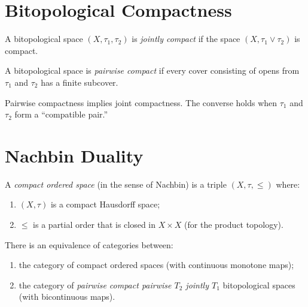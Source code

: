 \section{Bitopological Compactness}

\begin{definition}
A bitopological space $(X,\tau_1,\tau_2)$ is \emph{jointly compact} if the space
$(X, \tau_1 \vee \tau_2)$ is compact.
\end{definition}

\begin{definition}
A bitopological space is \emph{pairwise compact} if every cover consisting of opens from
$\tau_1$ and $\tau_2$ has a finite subcover.
\end{definition}

\begin{proposition}
Pairwise compactness implies joint compactness. The converse holds when $\tau_1$ and
$\tau_2$ form a ``compatible pair.''
\end{proposition}

\section{Nachbin Duality}

\begin{definition}
A \emph{compact ordered space} (in the sense of Nachbin) is a triple $(X, \tau, \leq)$
where:
\begin{enumerate}
  \item $(X,\tau)$ is a compact Hausdorff space;
  \item $\leq$ is a partial order that is closed in $X \times X$ (for the product
    topology).
\end{enumerate}
\end{definition}

\begin{theorem}
There is an equivalence of categories between:
\begin{enumerate}
  \item the category of compact ordered spaces (with continuous monotone maps);
  \item the category of \emph{pairwise compact pairwise $T_2$ jointly $T_1$}
    bitopological spaces (with bicontinuous maps).
\end{enumerate}
\end{theorem}

